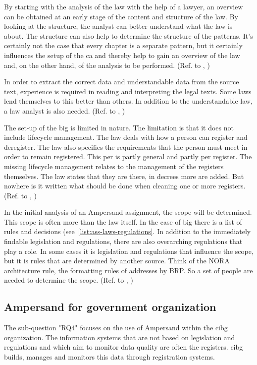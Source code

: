 By starting with the analysis of the law with the help of a lawyer, an overview can be obtained at an early stage of the content and structure of the law.
By looking at the structure, the analyst can better understand what the law is about.
The structure can also help to determine the structure of the patterns.
It's certainly not the case that every chapter is a separate pattern, but it certainly influences the setup of the \acrlong{ca} and thereby help to gain an overview of the law and, on the other hand, of the analysis to be performed.
(Ref. to , )


In order to extract the correct data and understandable data from the source text, experience is required in reading and interpreting the legal texts.
Some laws lend themselves to this better than others.
In addition to the understandable law, a law analyst is also needed.
(Ref. to , )


The set-up of the \acrshort{big} is limited in nature.
The limitation is that it does not include lifecycle management.
The law deals with how a person can register and deregister.
The law also specifies the requirements that the person must meet in order to remain registered.
This per is partly general and partly per register.
The missing lifecycle management relates to the management of the registers themselves.
The law states that they are there, in decrees more are added.
But nowhere is it written what should be done when cleaning one or more registers.
(Ref. to ,  )


In the initial analysis of an Ampersand assignment, the scope will be determined.
This scope is often more than the law itself.
In the case of \acrshort{big} there is a list of rules and decisions (see~\ref{list:ass-laws-regulations}.
In addition to the immediately findable legislation and regulations, there are also overarching regulations that play a role.
In some cases it is legislation and regulations that influence the scope, but it is rules that are determined by another source.
Think of the NORA architecture rule, the formatting rules of addresses by BRP.
So a set of people are needed to determine the scope.
(Ref. to , )

\subsection{Ampersand for government organization}\label{subsection:ampersand-for-government-organization}
The sub-question "\acrlong{RQ4}" focuses on the use of Ampersand within the \acrshort{cibg} organization.
The information systems that are not based on legislation and regulations and which aim to monitor data quality are often the registers.
\acrshort{cibg} builds, manages and monitors this data through registration systems.


